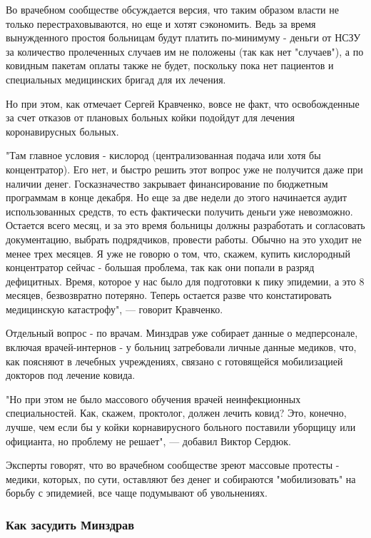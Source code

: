 Во врачебном сообществе обсуждается версия, что таким образом власти не только
перестраховываются, но еще и хотят сэкономить. Ведь за время вынужденного
простоя больницам будут платить по-минимуму - деньги от НСЗУ за количество
пролеченных случаев им не положены (так как нет "случаев"), а по ковидным
пакетам оплаты также не будет, поскольку пока нет пациентов и специальных
медицинских бригад для их лечения.

Но при этом, как отмечает Сергей Кравченко, вовсе не факт, что освобожденные за
счет отказов от плановых больных койки подойдут для лечения коронавирусных
больных.

"Там главное условия - кислород (централизованная подача или хотя бы
концентратор). Его нет, и быстро решить этот вопрос уже не получится даже при
наличии денег. Госказначество закрывает финансирование по бюджетным программам
в конце декабря. Но еще за две недели до этого начинается аудит использованных
средств, то есть фактически получить деньги уже невозможно. Остается всего
месяц, и за это время больницы должны разработать и согласовать документацию,
выбрать подрядчиков, провести работы. Обычно на это уходит не менее трех
месяцев. Я уже не говорю о том, что, скажем, купить кислородный концентратор
сейчас - большая проблема, так как они попали в разряд дефицитных. Время,
которое у нас было для подготовки к пику эпидемии, а это 8 месяцев,
безвозвратно потеряно. Теперь остается разве что констатировать медицинскую
катастрофу", --- говорит Кравченко.

Отдельный вопрос - по врачам. Минздрав уже собирает данные о медперсонале,
включая врачей-интернов - у больниц затребовали личные данные медиков, что, как
поясняют в лечебных учреждениях, связано с готовящейся мобилизацией докторов
под лечение ковида. 

"Но при этом не было массового обучения врачей неинфекционных специальностей.
Как, скажем, проктолог, должен лечить ковид? Это, конечно, лучше, чем если бы у
койки корнавирусного больного поставили уборщицу или официанта, но проблему не
решает", --- добавил Виктор Сердюк.

Эксперты говорят, что во врачебном сообществе зреют массовые протесты - медики,
которых, по сути, оставляют без денег и собираются "мобилизовать" на борьбу с
эпидемией, все чаще подумывают об увольнениях.

\subsubsection{Как засудить Минздрав}

